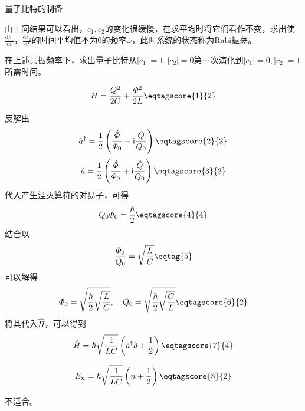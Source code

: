 \documentclass[answer]{cphos}
\begin{document}
\begin{problem}[50]{量子比特的制备}
\begin{problemstatement}
由上问结果可以看出，$c_1, c_2$的变化很缓慢，在求平均时将它们看作不变，求出使$\frac{\mathrm{d}c_1}{\mathrm{d}t}$，$\frac{\mathrm{d}c_2}{\mathrm{d}t}$的时间平均值不为$0$的频率$\omega$，此时系统的状态称为Rabi振荡。

在上述共振频率下，求出量子比特从$|c_1|=1, |c_2|=0$第一次演化到$|c_1|=0, |c_2|=1$所需时间。

\end{problemstatement}

\begin{solution}

\begin{equation}
   H=\frac{Q^2}{2C}+\frac{\varPhi^2}{2L} \eqtagscore{1}{2}
\end{equation}

反解出
\begin{equation}
   \hat{a}^\dagger=\frac{1}{2}\left(\frac{\hat{\varPhi}}{\varPhi_0}-\mathrm{i}\frac{\hat{Q}}{Q_0}\right) \eqtagscore{2}{2}
\end{equation}
\begin{equation}
   \hat{a}=\frac{1}{2}\left(\frac{\hat{\varPhi}}{\varPhi_0}+\mathrm{i}\frac{\hat{Q}}{Q_0}\right) \eqtagscore{3}{2}
\end{equation}
代入产生湮灭算符的对易子，可得
\begin{equation}
    Q_0\varPhi_0=\frac{\hslash}{2} \eqtagscore{4}{4}
\end{equation}
结合以
\begin{equation}
    \frac{\varPhi_0}{Q_0}=\sqrt{\frac{L}{C}} \eqtag{5}
\end{equation}
可以解得
\begin{equation}
    \varPhi_0=\sqrt{\frac{\hslash}{2}\sqrt{\frac{L}{C}}},\quad
    Q_0=\sqrt{\frac{\hslash}{2}\sqrt{\frac{C}{L}}} \eqtagscore{6}{2}
\end{equation}
将其代入$\hat{H}$，可以得到
\begin{equation}
    \hat{H}=\hslash\sqrt{\frac{1}{LC}}\left(\hat{a}^\dagger\hat{a}+\frac{1}{2}\right) \eqtagscore{7}{4}
\end{equation}

\begin{equation}
    E_n=\hslash\sqrt{\frac{1}{LC}}\left(n+\frac{1}{2}\right) \eqtagscore{8}{2}
\end{equation}

不适合。


\end{solution}
\end{problem}
\end{document}
